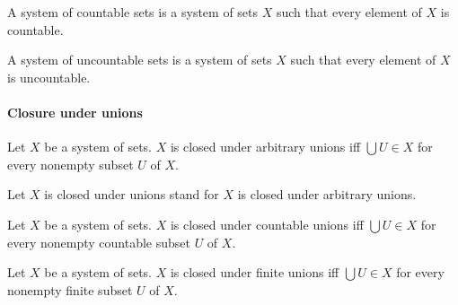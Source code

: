 \documentclass[10pt]{article}
\begin{document}
  \begin{forthel}
    \begin{definition}
      A system of countable sets is a system of sets $X$ such that every element
      of $X$ is countable.
    \end{definition}
  \end{forthel}

  \begin{forthel}
    \begin{definition}
      A system of uncountable sets is a system of sets $X$ such that every
      element of $X$ is uncountable.
    \end{definition}
  \end{forthel}


  \paragraph{Closure under unions}

  \begin{forthel}
    \begin{definition}
      Let $X$ be a system of sets.
      $X$ is closed under arbitrary unions iff $\bigcup U \in X$ for every
      nonempty subset $U$ of $X$.
    \end{definition}

    Let $X$ is closed under unions stand for $X$ is closed under arbitrary
    unions.
  \end{forthel}

  \begin{forthel}
    \begin{definition}
      Let $X$ be a system of sets.
      $X$ is closed under countable unions iff $\bigcup U \in X$ for every
      nonempty countable subset $U$ of $ X$.
    \end{definition}
  \end{forthel}

  \begin{forthel}
    \begin{definition}
      Let $X$ be a system of sets.
      $X$ is closed under finite unions iff $\bigcup U \in X$ for every nonempty
      finite subset $U$ of $X$.
    \end{definition}
  \end{forthel}
\end{document}
